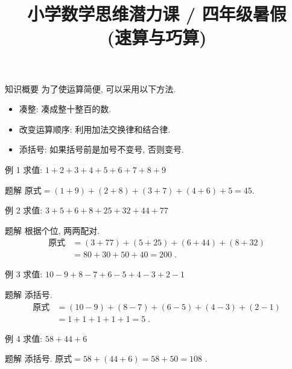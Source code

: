 \documentclass[content.tex]{subfiles}
\title{小学数学思维潜力课 / 四年级暑假 \\ (速算与巧算)}
\begin{document}
\begin{frame}
\maketitle
\end{frame}

\begin{frame}{知识概要}
为了使运算简便, 可以采用以下方法.
\begin{itemize}
\item 凑整: 凑成整十整百的数.
\item 改变运算顺序: 利用加法交换律和结合律.
\item 添括号: 如果括号前是加号不变号, 否则变号.
\end{itemize}
\end{frame}

\begin{frame}{例 1}
求值: $1+2+3+4+5+6+7+8+9$
\begin{exampleblock}{题解}
$\text{原式}=(1+9)+(2+8)+(3+7)+(4+6)+5=45$.
\end{exampleblock}
\end{frame}

\begin{frame}{例 2}
求值: $3+5+6+8+25+32+44+77$
\begin{exampleblock}{题解}
根据个位, 两两配对.
\begin{align*}
\text{原式}&=(3+77)+(5+25)+(6+44)+(8+32)\\
&=80+30+50+40=200\;.
\end{align*}
\end{exampleblock}
\end{frame}

\begin{frame}{例 3}
求值: $10-9+8-7+6-5+4-3+2-1$
\begin{exampleblock}{题解}
添括号.
\begin{align*}
\text{原式} &= (10-9)+(8-7)+(6-5)+(4-3)+(2-1)\\
&=1+1+1+1+1=5\;.
\end{align*}
\end{exampleblock}
\end{frame}

\begin{frame}{例 4}
求值: $58+44+6$
\begin{exampleblock}{题解}
添括号. $\text{原式} = 58 + (44 + 6) = 58 + 50 = 108$ .
\end{exampleblock}
\end{frame}
\end{document}
